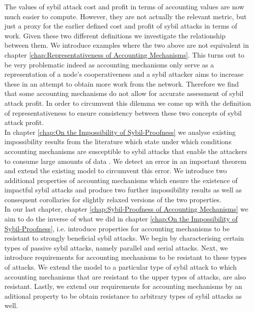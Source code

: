 \noindent{}The values of sybil attack cost and profit in terms of accounting values are now much easier to compute. However, they are not actually the relevant metric, but just a proxy for the earlier defined cost and profit of sybil attacks in terms of work. Given these two different definitions we investigate the relationship between them. We introduce examples where the two above are not equivalent in chapter \ref{chap:Representativeness of Accounting Mechanisms}. This turns out to be very problematic indeed as accounting mechanisms only serve as a representation of a node's cooperativeness and a sybil attacker aims to increase these in an attempt to obtain more work from the network. Therefore we find that some accounting mechanisms do not allow for accurate assessment of sybil attack profit. In order to circumvent this dilemma we come up with the definition of representativeness to ensure consistency between these two concepts of sybil attack profit.\vspace{1em}\\

\noindent{}In chapter \ref{chap:On the Impossibility of Sybil-Proofness} we analyse existing impossibility results from the literature which state under which conditions accounting mechanisms are susceptible to sybil attacks that enable the attackers to consume large amounts of data \cite{On the Sybil-Proofness of Accounting Mechanisms}. We detect an error in an important theorem and extend the existing model to circumvent this error. We introduce two additional properties of accounting mechanisms which ensure the existence of impactful sybil attacks and produce two further impossibility results as well as consequent corollaries for slightly relaxed versions of the two properties.\vspace{1em}\\

\noindent{}In our last chapter, chapter \ref{chap:Sybil-Proofness of Accounting Mechanisms} we aim to do the inverse of what we did in chapter \ref{chap:On the Impossibility of Sybil-Proofness}, i.e. introduce properties for accounting mechanisms to be resistant to strongly beneficial sybil attacks. We begin by characterising certain types of passive sybil attacks, namely parallel and serial attacks. Next, we introduce requirements for accounting mechanisms to be resistant to these types of attacks. We extend the model to a particular type of sybil attack to which accounting mechanisms that are resistant to the upper types of attacks, are also resistant. Lastly, we extend our requirements for accounting mechanisms by an aditional property to be obtain resistance to arbitrary types of sybil attacks as well. \vspace{1em}\\


